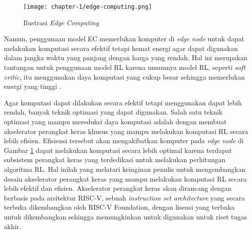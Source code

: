 \begin{figure}[h]
	\centering
	\texttt{[image: chapter-1/edge-computing.png]}
	\caption{Ilustrasi \textit{Edge Computing}}
	\label{fig:edge-computing}
\end{figure}

Namun, penggunaan model \ac{EC} memerlukan komputer di \textit{edge node} untuk dapat melakukan komputasi secara efektif tetapi hemat energi agar dapat digunakan dalam jangka waktu yang panjang dengan harga yang rendah. Hal ini merupakan tantangan untuk penggunaan model \ac{RL} karena umumnya model \ac{RL}, seperti \textit{soft critic}, itu menggunakan daya komputasi yang cukup besar sehingga memerlukan energi yang tinggi \parencite{wang2022efficient}.

Agar komputasi dapat dilakukan secara efektif tetapi menggunakan dapat lebih rendah, banyak teknik optimasi yang dapat digunakan. Salah satu teknik optimasi yang mampu mereduksi daya komputasi adalah dengan membuat akselerator perangkat keras khusus yang mampu melakukan komputasi RL secara lebih efisien. Efisiensi tersebut akan mengakibatkan komputer pada \textit{edge node} di Gambar \ref{fig:edge-computing} dapat melakukan komputasi secara lebih optimal karena terdapat subsistem perangkat keras yang terdedikasi untuk melakukan perhitungan algoritma RL. Hal inilah yang melatari keinginan penulis untuk mengembangkan desain akselerator perangkat keras yang mampu melakukan komputasi RL secara lebih efektif dan efisien. Akselerator perangkat keras akan dirancang dengan berbasis pada arsitektur RISC-V, sebuah \textit{instruction set architecture} yang secara terbuka dikembangkan oleh RISC-V Foundation, dengan lisensi yang terbuka untuk dikembangkan sehingga memungkinkan untuk digunakan untuk riset tugas akhir.
